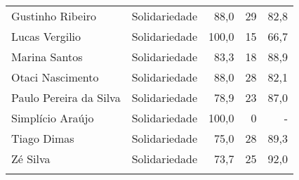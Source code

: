 \begin{longtable}{llrrr}
                    Gustinho Ribeiro &  Solidariedade &      88,0 &           29 &       82,8 \\
                      Lucas Vergilio &  Solidariedade &     100,0 &           15 &       66,7 \\
                       Marina Santos &  Solidariedade &      83,3 &           18 &       88,9 \\
                    Otaci Nascimento &  Solidariedade &      88,0 &           28 &       82,1 \\
              Paulo Pereira da Silva &  Solidariedade &      78,9 &           23 &       87,0 \\
                    Simplício Araújo &  Solidariedade &     100,0 &            0 &          - \\
                         Tiago Dimas &  Solidariedade &      75,0 &           28 &       89,3 \\
                            Zé Silva &  Solidariedade &      73,7 &           25 &       92,0 \\
\label{tab:alinha-dep}
\end{longtable}
